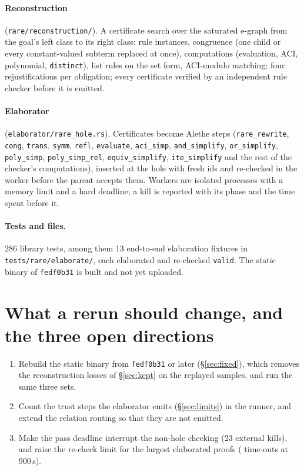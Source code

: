 \documentclass[11pt,a4paper]{article}
\newcommand{\code}[1]{\texttt{#1}}
\begin{document}
\paragraph{Reconstruction} (\code{rare/reconstruction/}). A certificate
search over the saturated e-graph from the goal's left class to its right
class: rule instances, congruence (one child or every constant-valued
subterm replaced at once), computations (evaluation, ACI, polynomial,
\code{distinct}), list rules on the set form, ACI-modulo matching; four
rejustifications per obligation; every certificate verified by an
independent rule checker before it is emitted.

\paragraph{Elaborator} (\code{elaborator/rare\_hole.rs}). Certificates
become Alethe steps (\code{rare\_rewrite}, \code{cong}, \code{trans},
\code{symm}, \code{refl}, \code{evaluate}, \code{aci\_simp},
\code{and\_simplify}, \code{or\_simplify}, \code{poly\_simp},
\code{poly\_simp\_rel}, \code{equiv\_simplify}, \code{ite\_simplify} and
the rest of the checker's computations), inserted at the hole with fresh
ids and re-checked in the worker before the parent accepts them. Workers
are isolated processes with a memory limit and a hard deadline; a kill is
reported with its phase and the time spent before it.

\paragraph{Tests and files.} 286 library tests, among them 13 end-to-end
elaboration fixtures in \code{tests/rare/elaborate/}, each elaborated and
re-checked \code{valid}. The static binary of \code{fedf0b31} is built and
not yet uploaded.

\section{What a rerun should change, and the three open directions}\label{sec:next}

\begin{enumerate}
  \item Rebuild the static binary from \code{fedf0b31} or later
    (\S\ref{sec:fixed}), which removes the reconstruction losses of
    \S\ref{sec:kept} on the replayed samples, and run the same three sets.
  \item Count the trust steps the elaborator emits (\S\ref{sec:limits}) in
    the runner, and extend the relation routing so that they are not
    emitted.
  \item Make the pass deadline interrupt the non-hole checking (23
    external kills), and raise the re-check limit for the largest
    elaborated proofs (\nrecheckto{} time-outs at 900\,s).
\end{enumerate}
\end{document}
